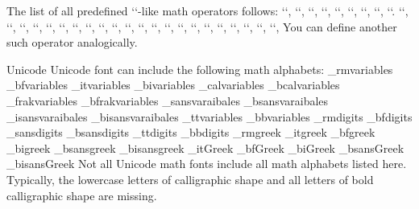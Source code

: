 The list of all predefined `\rm`-like math operators follows: `\arccos`,
`\arcsin`, `\arctan`, `\arg`, `\cos`, `\cosh`, `\cot`, `\coth`, `\deg`.
`\det`, `\dim`, `\exp`, `\gcd`, `\hom`, `\inf`, `\ker`, `\lg`, `\lim`,
`\liminf`, `\limsup`, `\ln`, `\log`, `\max`, `\min`, `\Pr`, `\scs`, `\sin`,
`\sinh`, `\sup`, `\tan`, `\tanh`, You can define another such operator
analogically.

\new Unicode
Unicode font can include the following math alphabets:
\begtt \typosize[9/11]
\_rmvariables      %
\_bfvariables      %
\_itvariables      %
\_bivariables      %
\_calvariables     %
\_bcalvariables    %
\_frakvariables    %
\_bfrakvariables   %
\_sansvaraibales   %
\_bsansvaraibales  %
\_isansvaraibales  %
\_bisansvaraibales %
\_ttvariables      %
\_bbvariables      %
\_rmdigits         %
\_bfdigits         %
\_sansdigits       %
\_bsansdigits      %
\_ttdigits         %
\_bbdigits         %
\_rmgreek          %
\_itgreek          %
\_bfgreek          %
\_bigreek          %
\_bsansgreek       %
\_bisansgreek      %
\_itGreek          %
\_bfGreek          %
\_biGreek          %
\_bsansGreek       %
\_bisansGreek      %
\endtt
%
Not all Unicode math fonts include all math alphabets listed here. Typically, 
the lowercase letters of calligraphic shape and all letters of
bold calligraphic shape are missing.

